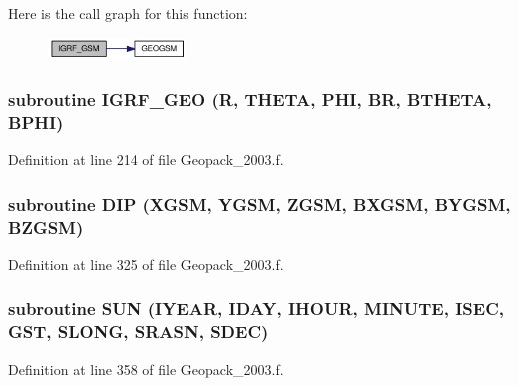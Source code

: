 Here is the call graph for this function:\nopagebreak
\begin{figure}[H]
\begin{center}
\leavevmode
\includegraphics[width=104pt]{_geopack__2003_8f_7ed9719f68132703108e5b59d36d7c03_cgraph}
\end{center}
\end{figure}
\hypertarget{_geopack__2003_8f_d3225aa14c76ab4531fcf76deb3c15e0}{
\subsubsection[{IGRF\_\-GEO}]{\setlength{\rightskip}{0pt plus 5cm}subroutine IGRF\_\-GEO (R, \/  THETA, \/  PHI, \/  BR, \/  BTHETA, \/  BPHI)}}
\label{_geopack__2003_8f_d3225aa14c76ab4531fcf76deb3c15e0}




Definition at line 214 of file Geopack\_\-2003.f.\hypertarget{_geopack__2003_8f_a4095b06f000636e34e2581a92ed28f0}{
\subsubsection[{DIP}]{\setlength{\rightskip}{0pt plus 5cm}subroutine DIP (XGSM, \/  YGSM, \/  ZGSM, \/  BXGSM, \/  BYGSM, \/  BZGSM)}}
\label{_geopack__2003_8f_a4095b06f000636e34e2581a92ed28f0}




Definition at line 325 of file Geopack\_\-2003.f.\hypertarget{_geopack__2003_8f_59da55e19c09037b70bd65ec97a3567a}{
\subsubsection[{SUN}]{\setlength{\rightskip}{0pt plus 5cm}subroutine SUN (IYEAR, \/  IDAY, \/  IHOUR, \/  MINUTE, \/  ISEC, \/  GST, \/  SLONG, \/  SRASN, \/  SDEC)}}
\label{_geopack__2003_8f_59da55e19c09037b70bd65ec97a3567a}




Definition at line 358 of file Geopack\_\-2003.f.

